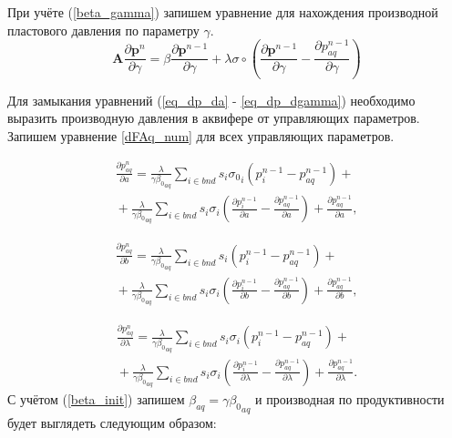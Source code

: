 \documentclass[14pt]{article}
\begin{document}
При учёте (\ref{beta_gamma}) запишем уравнение для нахождения производной пластового давления по параметру $ \gamma $.
\begin{equation} \label{eq_dp_dgamma}
\boldsymbol{A}\frac{\partial \boldsymbol{p}^n}{\partial \gamma} =
 \beta\frac{\partial \boldsymbol{p}^{n-1}}{\partial \gamma}
  + \lambda\sigma \circ \left(\frac{\partial \boldsymbol{p}^{n-1}}{\partial \gamma}
  -\frac{\partial p_{aq}^{n-1}}{\partial \gamma}\right)
\end{equation}


Для замыкания уравнений (\ref{eq_dp_da} - \ref{eq_dp_dgamma}) необходимо выразить производную давления в аквифере от управляющих параметров. Запишем уравнение \ref{dFAq_num} для всех управляющих параметров.

\begin{multline} \label{dAQ_da}
\frac{\partial p_{aq}^n}{\partial a}
= \frac{\lambda}{\gamma{\beta_0}_{aq}}\sum_{i \in bnd}s_i{\sigma_0}_i\left(p_i^{n-1}-p_{aq}^{n-1}\right) +  {} \\
{} +\frac{\lambda}{\gamma{\beta_0}_{aq}}\sum_{i \in bnd}s_i\sigma_i\left(\frac{\partial p_i^{n-1}}{\partial a}-\frac{\partial p_{aq}^{n-1}}{\partial a}\right)+ \frac{\partial p_{aq}^{n-1}}{\partial a},
\end{multline}

\begin{multline} \label{dAQ_db}
\frac{\partial p_{aq}^n}{\partial b}
= \frac{\lambda}{\gamma{\beta_0}_{aq}}\sum_{i \in bnd}s_i \left(p_i^{n-1}-p_{aq}^{n-1}\right) +  {} \\
{} +\frac{\lambda}{\gamma{\beta_0}_{aq}}\sum_{i \in bnd}s_i\sigma_i\left(\frac{\partial p_i^{n-1}}{\partial b}-\frac{\partial p_{aq}^{n-1}}{\partial b}\right) + \frac{\partial p_{aq}^{n-1}}{\partial b},
\end{multline}

\begin{multline} \label{dAQ_dlam}
\frac{\partial p_{aq}^n}{\partial \lambda}
= \frac{\lambda}{\gamma{\beta_0}_{aq}}\sum_{i \in bnd}s_i\sigma_i\left(p_i^{n-1}-p_{aq}^{n-1}\right) +  {} \\
{} +
\frac{\lambda}{\gamma{\beta_0}_{aq}}\sum_{i \in bnd}s_i\sigma_i\left(\frac{\partial p_i^{n-1}}{\partial \lambda}-\frac{\partial p_{aq}^{n-1}}{\partial \lambda}\right)+ \frac{\partial p_{aq}^{n-1}}{\partial \lambda}.
\end{multline}
С учётом (\ref{beta_init}) запишем $ \beta_{aq} = \gamma{\beta_0}_{aq} $ и производная по продуктивности будет выглядеть следующим образом:
\end{document}
